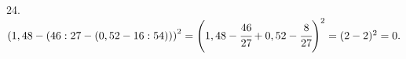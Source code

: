 24. $\left(1,48-\left(46:27-(0,52-16:54)\right)\right)^2=\left(1,48-\cfrac{46}{27}+0,52-\cfrac{8}{27}\right)^2=(2-2)^2=0.$\\
